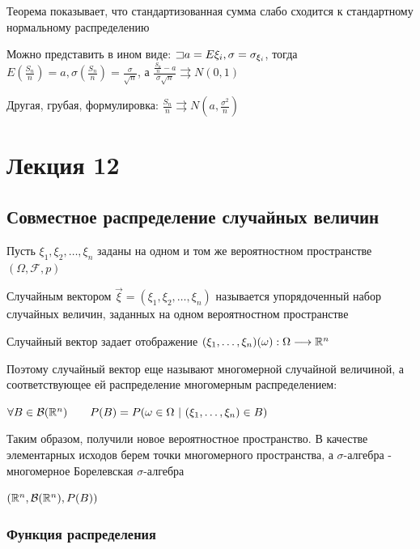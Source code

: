 \documentclass[12pt]{article}
\begin{document}
    Теорема показывает, что стандартизованная сумма слабо сходится к стандартному нормальному распределению

    \Nota Можно представить в ином виде: $\mathord{\sqsupset} a = E\xi_i, \sigma = \sigma_{\xi_i}$, тогда $E\left(\frac{S_n}{n}\right) = a, \sigma\left(\frac{S_n}{n}\right) = \frac{\sigma}{\sqrt{n}}$, а $\frac{\frac{S_n}{n} - a}{\sigma \sqrt{n}} \rightrightarrows N(0, 1)$

    \Nota Другая, грубая, формулировка: $\frac{S_n}{n} \rightrightarrows N\left(a, \frac{\sigma^2}{n}\right)$


    \section{Лекция 12}

    \subsection{Совместное распределение случайных величин}

    Пусть $\xi_1, \xi_2, \dots, \xi_n$ заданы на одном и том же вероятностном пространстве $(\Omega, \mathcal{F}, p)$

    \Def Случайным вектором $\vec{\xi} = (\xi_1, \xi_2, \dots, \xi_n)$ называется упорядоченный набор случайных величин, заданных
    на одном вероятностном пространстве

    Случайный вектор задает отображение $(\xi_1, \dots, \xi_n) (\omega) : \Omega \longrightarrow \mathbb{R}^n$

    Поэтому случайный вектор еще называют многомерной случайной величиной, 
    а соответствующее ей распределение многомерным распределением: 

    $\forall B \in \mathcal{B}(\mathbb{R}^n) \qquad P(B) = P(\omega \in \Omega \ | \ (\xi_1, \dots, \xi_n) \in B)$

    Таким образом, получили новое вероятностное пространство. В качестве элементарных исходов берем точки многомерного пространства, 
    а $\sigma$-алгебра - многомерное Борелевская $\sigma$-алгебра

    $(\mathbb{R}^n, \mathcal{B}(\mathbb{R}^n), P(B))$

    \subsubsection{Функция распределения}
\end{document}
